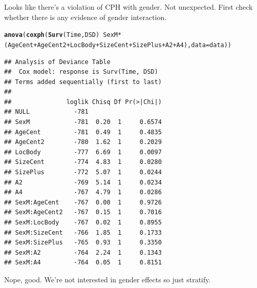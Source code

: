 \documentclass{article}\usepackage[]{graphicx}\usepackage[]{color}
\makeatletter
\newcommand{\hlopt}[1]{\textcolor[rgb]{0,0,0}{#1}}%
\newcommand{\hlstd}[1]{\textcolor[rgb]{0.345,0.345,0.345}{#1}}%
\newcommand{\hlkwc}[1]{\textcolor[rgb]{0.333,0.667,0.333}{#1}}%
\newcommand{\hlkwd}[1]{\textcolor[rgb]{0.737,0.353,0.396}{\textbf{#1}}}%
\newenvironment{kframe}{%
 \def\at@end@of@kframe{}%
 \ifinner\ifhmode%
  \def\at@end@of@kframe{\end{minipage}}%
  \begin{minipage}{\columnwidth}%
 \fi\fi%
 \def\FrameCommand##1{\hskip\@totalleftmargin \hskip-\fboxsep
 \colorbox{shadecolor}{##1}\hskip-\fboxsep
     \hskip-\linewidth \hskip-\@totalleftmargin \hskip\columnwidth}%
 \MakeFramed {\advance\hsize-\width
   \@totalleftmargin\z@ \linewidth\hsize
   \@setminipage}}%
 {\par\unskip\endMakeFramed%
 \at@end@of@kframe}
\newenvironment{knitrout}{}{} %
\makeatother
\begin{document}
Looks like there's a violation of CPH with gender.  Not unexpected.  First check whether there is any evidence of gender interaction.
\begin{knitrout}
\color{fgcolor}\begin{kframe}
\begin{alltt}
\hlkwd{anova}\hlstd{(}\hlkwd{coxph}\hlstd{(}\hlkwd{Surv}\hlstd{(Time, DSD)} \hlopt{~} \hlstd{SexM}\hlopt{*}\hlstd{(AgeCent} \hlopt{+} \hlstd{AgeCent2} \hlopt{+} \hlstd{LocBody} \hlopt{+} \hlstd{SizeCent} \hlopt{+} \hlstd{SizePlus} \hlopt{+} \hlstd{A2} \hlopt{+} \hlstd{A4),} \hlkwc{data} \hlstd{= data))}
\end{alltt}
\begin{verbatim}
## Analysis of Deviance Table
##  Cox model: response is Surv(Time, DSD)
## Terms added sequentially (first to last)
## 
##               loglik Chisq Df Pr(>|Chi|)
## NULL            -781                    
## SexM            -781  0.20  1     0.6574
## AgeCent         -781  0.49  1     0.4835
## AgeCent2        -780  1.62  1     0.2029
## LocBody         -777  6.69  1     0.0097
## SizeCent        -774  4.83  1     0.0280
## SizePlus        -772  5.07  1     0.0244
## A2              -769  5.14  1     0.0234
## A4              -767  4.79  1     0.0286
## SexM:AgeCent    -767  0.00  1     0.9726
## SexM:AgeCent2   -767  0.15  1     0.7016
## SexM:LocBody    -767  0.02  1     0.8955
## SexM:SizeCent   -766  1.85  1     0.1733
## SexM:SizePlus   -765  0.93  1     0.3350
## SexM:A2         -764  2.24  1     0.1343
## SexM:A4         -764  0.05  1     0.8151
\end{verbatim}
\end{kframe}
\end{knitrout}
Nope, good.  We're not interested in gender effects so just stratify.
\end{document}
